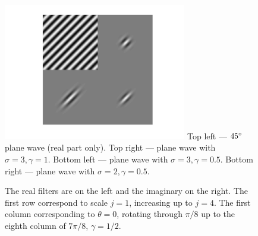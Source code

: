   \begin{figure}
    \begin{center}
      \includegraphics[height=6cm]{litreview/images/morlet_filters.png}
              {Top left --- $45{^{\circ}}$ plane wave (real part only). Top right --- plane wave with
              $\sigma=3,\gamma=1$. Bottom left --- plane wave with $\sigma=3,\gamma=0.5$. Bottom
            right --- plane wave with $\sigma=2,\gamma=0.5$.}
      \label{fig:morlet_filters}
    \end{center}
  \end{figure}

  \begin{figure}
    \begin{center}
              {The real filters are on the left and the imaginary on the right. The first row
              correspond to scale $j=1$, increasing up to $j=4$. The first column corresponding to
            $\theta = 0$, rotating through $\pi/8$ up to the eighth column of $7\pi/8$,
          $\gamma=1/2$.} 
      \label{fig:morlet_wavelets_full}
    \end{center}
  \end{figure}

